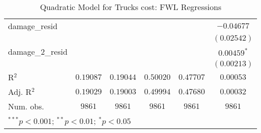 \begin{table}
\begin{center}
\begin{tabular}{l c c c c c}
damage\_resid    &                  &                  &                 &                 & $-0.04677$    \\
                 &                  &                  &                 &                 & $(0.02542)$   \\
damage\_2\_resid &                  &                  &                 &                 & $0.00459^{*}$ \\
                 &                  &                  &                 &                 & $(0.00213)$   \\
\hline
R$^2$            & $0.19087$        & $0.19044$        & $0.50020$       & $0.47707$       & $0.00053$     \\
Adj. R$^2$       & $0.19029$        & $0.19003$        & $0.49994$       & $0.47680$       & $0.00032$     \\
Num. obs.        & $9861$           & $9861$           & $9861$          & $9861$          & $9861$        \\
\hline
\multicolumn{6}{l}{\scriptsize{$^{***}p<0.001$; $^{**}p<0.01$; $^{*}p<0.05$}}
\end{tabular}
\caption{Quadratic Model for Trucks cost: FWL Regressions}
\label{tab:reg_sq_damage_fwl}
\end{center}
\end{table}
